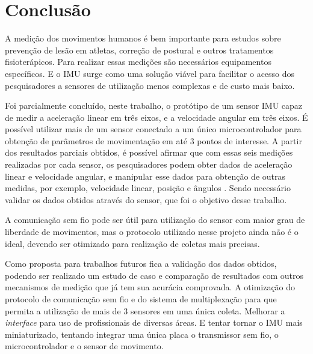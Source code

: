 \chapter{Conclusão}
	
	A medição dos movimentos  humanos é bem importante para estudos sobre prevenção de lesão em atletas, correção de postural e outros tratamentos fisioterápicos. Para realizar essas medições são necessários equipamentos específicos. E o IMU surge como uma solução viável para facilitar o acesso dos pesquisadores a sensores de utilização menos complexas e de custo mais baixo. 
	
	Foi parcialmente concluído, neste trabalho, o protótipo de um sensor IMU capaz de medir a aceleração linear em três eixos, e a velocidade angular em três eixos. É possível utilizar mais de um sensor conectado a um único microcontrolador para obtenção de parâmetros de movimentação em até 3 pontos de interesse. A partir dos resultados parciais obtidos, é possível afirmar que com essas seis medições realizadas por cada sensor, os pesquisadores podem obter dados de aceleração linear e velocidade angular, e manipular esse dados para obtenção de outras medidas, por exemplo, velocidade linear, posição e ângulos . Sendo necessário validar os dados obtidos através do sensor, que foi o objetivo desse trabalho.
	
	A comunicação sem fio pode ser útil para utilização do sensor com maior grau de liberdade de movimentos, mas o protocolo utilizado nesse projeto ainda não é o ideal, devendo ser otimizado para realização de coletas mais precisas. 
	
	Como proposta para trabalhos futuros fica a validação dos dados obtidos, podendo ser realizado um estudo de caso e comparação de resultados com outros mecanismos de medição que já tem sua acurácia comprovada. A otimização do protocolo de comunicação sem fio e do sistema de multiplexação para que permita a utilização de mais de 3 sensores em uma única coleta. Melhorar a \textit{interface}  para uso de profissionais de diversas áreas. E tentar tornar o IMU mais miniaturizado, tentando integrar uma única placa o transmissor sem fio, o microcontrolador e o sensor de movimento.